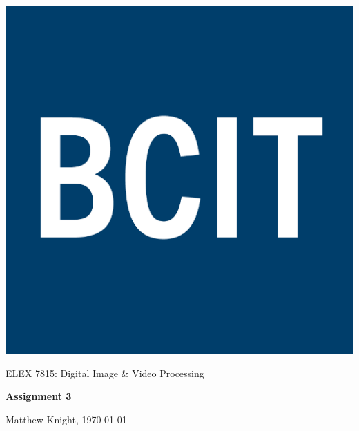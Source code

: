 \documentclass[12pt]{article}
\begin{document}
 

\thispagestyle{titlePage}

\includegraphics[scale=0.12]{BCIT}
\bigskip

\begin{center}
    
    {\fontsize{24pt}{6pt}\selectfont ELEX 7815: Digital Image \& Video Processing}
    
    \vspace{12pt}
    
    {\fontsize{28pt}{12pt}\selectfont\bfseries Assignment 3}
    
    \vspace{12pt}
    
    {\fontsize{16pt}{12pt}\selectfont Matthew Knight, \today}
    
    \vspace{24pt}

\end{center}

\pagebreak

\pagestyle{neilReport}


\end{document}

